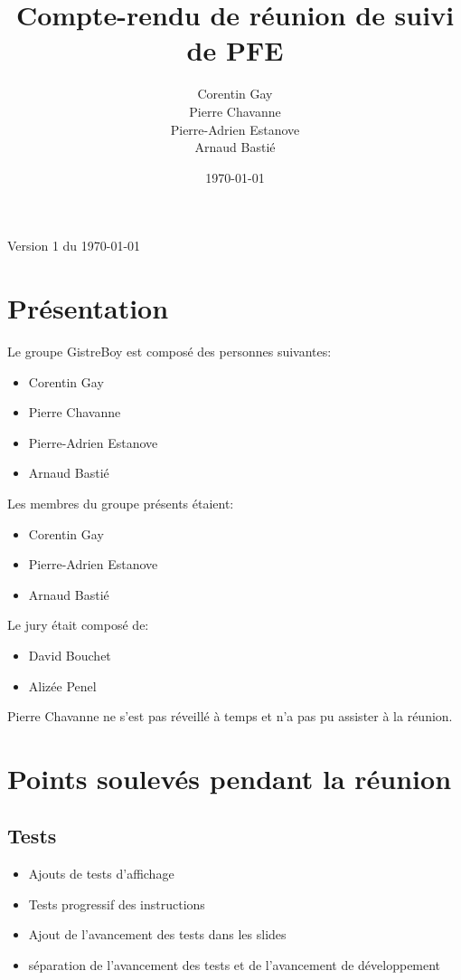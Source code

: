 \documentclass{article}
\author{Corentin Gay\\Pierre Chavanne\\Pierre-Adrien Estanove\\Arnaud
Basti\'e}
\date{\today}
\title{Compte-rendu de r\'eunion de suivi de PFE}
\begin{document}
\maketitle

Version 1 du \today
\section{Pr\'esentation}
Le groupe GistreBoy est compos\'e des personnes suivantes:
\begin{itemize}
	\item Corentin Gay
	\item Pierre Chavanne
	\item Pierre-Adrien Estanove
	\item Arnaud Basti\'e
\end{itemize}


Les membres du groupe pr\'esents \'etaient:
\begin{itemize}
	\item Corentin Gay
	\item Pierre-Adrien Estanove
	\item Arnaud Basti\'e
\end{itemize}


Le jury \'etait compos\'e de:
\begin{itemize}
	\item David Bouchet
	\item Aliz\'ee Penel
\end{itemize}
Pierre Chavanne ne s'est pas r\'eveill\'e \`a temps et n'a pas pu assister
\`a la r\'eunion.\\
\section{Points soulev\'es pendant la r\'eunion}

\subsection{Tests}
\begin{itemize}
	\item Ajouts de tests d'affichage
	\item Tests progressif des instructions
	\item Ajout de l'avancement des tests dans les slides
	\item s\'eparation de l'avancement des tests et de l'avancement de d\'eveloppement
\end{itemize}
\end{document}
